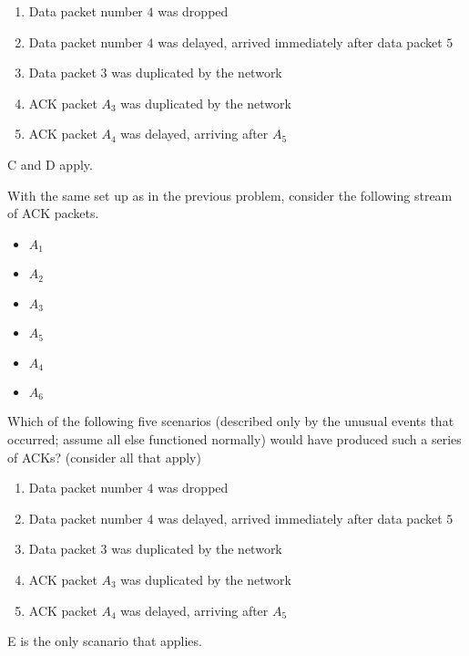 \documentclass{supervision}
\begin{document}
\begin{questions}
\begin{parts}
\begin{subparts}
              \begin{enumerate}[label=(\alph*)]
                \item Data packet number $4$ was dropped
                \item Data packet number $4$ was delayed, arrived immediately
                  after data packet $5$
                \item Data packet $3$ was duplicated by the network
                \item ACK packet $A_3$ was duplicated by the network
                \item ACK packet $A_4$ was delayed, arriving after $A_5$
              \end{enumerate}
              \begin{solution}
                C and D apply.
              \end{solution}

            \subpart With the same set up as in the previous problem,
              consider the following stream of ACK packets.

              \begin{itemize}
                \item $A_1$
                \item $A_2$
                \item $A_3$
                \item $A_5$
                \item $A_4$
                \item $A_6$
              \end{itemize}

              Which of the following five scenarios (described only by the
              unusual events that occurred; assume all else functioned
              normally) would have produced such a series of ACKs? (consider
              all that apply)

              \begin{enumerate}[label=(\alph*)]
                \item Data packet number $4$ was dropped
                \item Data packet number $4$ was delayed, arrived immediately
                after data packet $5$
                \item Data packet $3$ was duplicated by the network
                \item ACK packet $A_3$ was duplicated by the network
                \item ACK packet $A_4$ was delayed, arriving after $A_5$
              \end{enumerate}
              \begin{solution}
                E is the only scanario that applies.
              \end{solution}


\end{subparts}
\end{parts}
\end{questions}
\end{document}
